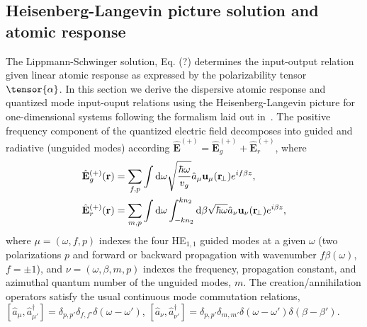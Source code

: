 \documentclass[preprint,aps,pra,onecolumn]{revtex4-1} %
\begin{document}
\subsection{Heisenberg-Langevin picture solution and atomic response}
The Lippmann-Schwinger solution, Eq. (?) determines the input-output relation given linear atomic 
response as expressed by the polarizability tensor $\tensor{\alpha}$.  In this section we derive the 
dispersive atomic response and quantized mode input-ouput relations using the Heisenberg-Langevin 
picture for one-dimensional systems following the formalism laid out in~\cite{Haikuta}.  The positive 
frequency component of the quantized electric field decomposes into guided and radiative (unguided 
modes) according  $\hat{\mathbf{E}}^{(+)}=\hat{\mathbf{E}}_g^{(+)}+\hat{\mathbf{E}}_{r}^{(+)}$, where
\begin{align}
\hat{\mathbf{E}}_g^{(+)}(\mathbf{r}) &= \sum_{f,p} \int \mathrm{d}\omega \sqrt{\frac{ \hbar \omega}{v_g}} 
\hat{a}_\mu \mathbf{u}_\mu (\mathbf{r}\!_\perp) e^{if\beta z},\\
\hat{\mathbf{E}}_r^{(+)}(\mathbf{r}) &= \sum_{m,p} \int \mathrm{d}\omega  \int_{-kn_2}^{kn_2}\mathrm{d}\beta 
\sqrt{ \hbar \omega} \hat{a}_\nu \mathbf{u}_\nu (\mathbf{r}\!_\perp) e^{i\beta z},
\end{align}
where $\mu =(\omega, f, p)$ indexes the four HE$_{1,1}$ guided modes at a given $\omega$ (two 
polarizations $p$ and forward or backward propagation with wavenumber $f\beta (\omega)$, 
$f=\pm1$), and $\nu=(\omega, \beta, m, p)$ indexes the frequency, propagation constant, and azimuthal 
quantum number of the unguided modes, $m$.  The creation/annihilation operators satisfy the usual 
continuous mode commutation relations, $[\hat{a}_\mu, \hat{a}^\dag_{\mu'} ] = \delta_{p,p'} \delta_{f,f'} 
\delta ( \omega - \omega ') $, $[\hat{a}_\nu ,\hat{a}^\dag_{\nu'} ] = \delta_{p,p'} \delta_{m,m'} \delta ( 
\omega - \omega ')  \delta ( \beta - \beta') $.
\end{document}
